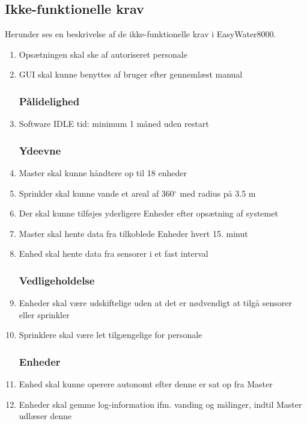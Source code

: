 \subsection{Ikke-funktionelle krav}
Herunder ses en beskrivelse af de ikke-funktionelle krav i EasyWater8000.
\begin{enumerate}

\subsubsection*{Brugbarhed}
\item Opsætningen skal ske af autoriseret personale
\item GUI skal kunne benyttes af bruger efter gennemlæst manual


\subsubsection*{Pålidelighed}
\item Software IDLE tid: minimum 1 måned uden restart


\subsubsection*{Ydeevne}
\item Master skal kunne håndtere op til 18 enheder
\item Sprinkler skal kunne vande et areal af 360$^{\circ}$ med radius på 3.5 m 
\item Der skal kunne tilføjes yderligere Enheder efter opsætning af systemet
\item Master skal hente data fra tilkoblede Enheder hvert 15. minut
\item Enhed skal hente data fra sensorer i et fast interval


\subsubsection*{Vedligeholdelse}
\item Enheder skal være udskiftelige uden at det er nødvendigt at tilgå sensorer eller sprinkler
\item Sprinklere skal være let tilgængelige for personale


\subsubsection*{Enheder}
\item Enhed skal kunne operere autonomt efter denne er sat op fra Master
\item Enheder skal gemme log-information ifm. vanding og målinger, indtil Master udlæser denne

\end{enumerate}

